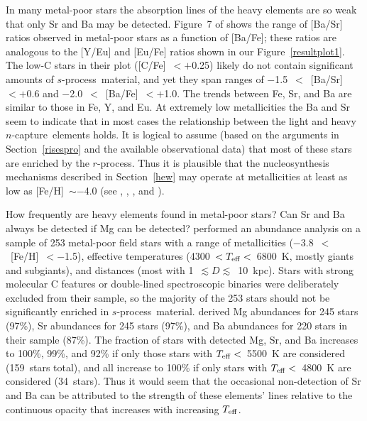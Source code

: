 \documentclass{emulateapj}
\def\rpro{\mbox{$r$-process}}
\def\spro{\mbox{$s$-process}}
\def\ncap{\mbox{$n$-capture}}
\begin{document}
In many metal-poor stars the absorption lines of the heavy elements
are so weak that only Sr and Ba may be detected. 
Figure~7 of \citet{sneden08} shows the range of [Ba/Sr] ratios
observed in metal-poor stars as a function of [Ba/Fe];
these ratios are analogous to the 
[Y/Eu] and [Eu/Fe] ratios shown in our Figure~\ref{resultplot1}.
The low-C stars in their plot ([C/Fe]~$< +$0.25) likely do 
not contain significant amounts of \spro\ material, and
yet they span ranges of $-$1.5~$<$~[Ba/Sr]~$< +$0.6
and $-$2.0~$<$~[Ba/Fe]~$< +$1.0.  
The trends between Fe, Sr, and Ba are similar to those in Fe, Y, and Eu.
At extremely low metallicities
the Ba and Sr seem to indicate that in most cases
the relationship between the light and heavy \ncap\ elements holds.
It is logical to assume (based on the arguments in Section~\ref{risespro}
and the available observational data) that most of
these stars are enriched by the \rpro.
Thus it is plausible that the nucleosynthesis mechanisms described
in Section~\ref{hew} may operate at metallicities at least as low as
[Fe/H]~$\sim -$4.0 (see \citealt{mcwilliam98}, \citealt{honda04},
\citealt{francois07}, and \citealt{lai08}).

How frequently are heavy elements found in metal-poor stars?
Can Sr and Ba always be detected if Mg can be detected?
\citet{barklem05} performed an abundance analysis on
a sample of 253 metal-poor field stars with a range of metallicities 
($-$3.8~$<$~[Fe/H]~$< -$1.5), effective temperatures 
(4300~$< T_{\rm eff} <$~6800~K, mostly giants and subgiants), 
and distances (most with 1~$\lesssim D \lesssim$~10~kpc).
Stars with strong molecular C features or double-lined spectroscopic
binaries were deliberately excluded from their sample, so the
majority of the 253 stars should not be significantly enriched
in \spro\ material.
\citet{barklem05} derived Mg abundances for 245 stars (97\%),
Sr abundances for 245 stars (97\%), and 
Ba abundances for 220 stars in their sample (87\%).
The fraction of stars with detected Mg, Sr, and Ba increases to 
100\%, 99\%, and 92\% if only those stars with $T_{\rm eff} <$~5500~K
are considered (159~stars total), and 
all increase to 100\% if only stars with $T_{\rm eff} <$~4800~K
are considered (34~stars).
Thus it would seem that the occasional non-detection of Sr and Ba
can be attributed to the strength of these elements' lines relative
to the continuous opacity that increases with increasing $T_{\rm eff}$.
\end{document}
